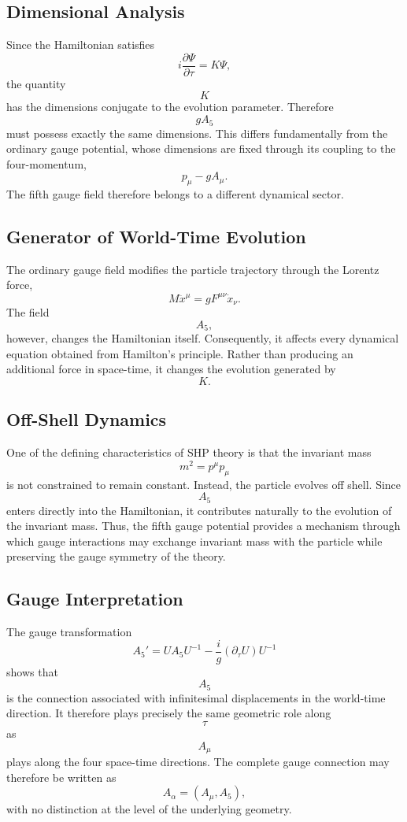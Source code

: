 \subsection{Dimensional Analysis}
Since the Hamiltonian satisfies
\[i\frac{\partial\Psi}{\partial\tau}=K\Psi,\]
the quantity
\[K\]
has the dimensions conjugate to the evolution parameter.
Therefore
\[gA_5\]
must possess exactly the same dimensions.
This differs fundamentally from the ordinary gauge potential,
whose dimensions are fixed through its coupling to the four-momentum,
\[p_\mu-gA_\mu.\]
The fifth gauge field therefore belongs to a different dynamical sector.
\subsection{Generator of World-Time Evolution}
The ordinary gauge field modifies the particle trajectory through the
Lorentz force,
\[M\ddot x^\mu=gF^{\mu\nu}\dot x_\nu.\]
The field
\[A_5,\]
however,
changes the Hamiltonian itself.
Consequently,
it affects every dynamical equation obtained from Hamilton's principle.
Rather than producing an additional force in space-time,
it changes the evolution generated by
\[K.\]
\subsection{Off-Shell Dynamics}
One of the defining characteristics of SHP theory is that the invariant
mass
\[m^2=p^\mu p_\mu\]
is not constrained to remain constant.
Instead,
the particle evolves off shell.
Since
\[A_5\]
enters directly into the Hamiltonian,
it contributes naturally to the evolution of the invariant mass.
Thus,
the fifth gauge potential provides a mechanism through which gauge
interactions may exchange invariant mass with the particle while
preserving the gauge symmetry of the theory.
\subsection{Gauge Interpretation}
The gauge transformation
\[A_5'=UA_5U^{-1}-\frac{i}{g}(\partial_\tau U)U^{-1}\]
shows that
\[A_5\]
is the connection associated with infinitesimal displacements in the
world-time direction.
It therefore plays precisely the same geometric role along
\[\tau\]
as
\[A_\mu\]
plays along the four space-time directions.
The complete gauge connection may therefore be written as
\[A_\alpha=(A_\mu,A_5),\]
with no distinction at the level of the underlying geometry.
